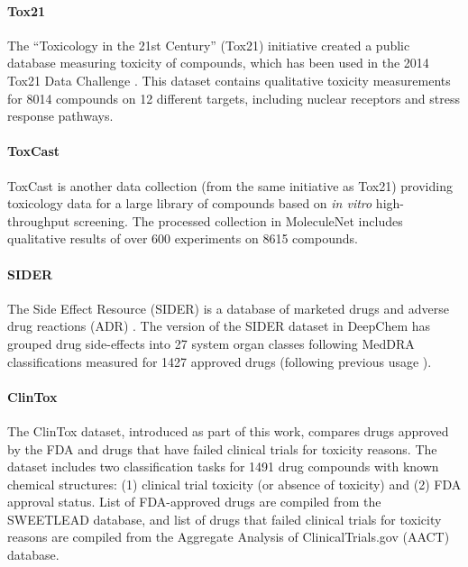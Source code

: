 \paragraph{Tox21}

The ``Toxicology in the 21st Century'' (Tox21) initiative created a public database measuring toxicity of compounds, which has been used in the 2014 Tox21 Data Challenge \cite{Tox21}. This dataset contains qualitative toxicity measurements for 8014 compounds on 12 different targets, including nuclear receptors and stress response pathways.


\paragraph{ToxCast}

ToxCast is another data collection (from the same initiative as Tox21) providing toxicology data for a large library of compounds based on \textit{in vitro} high-throughput screening.\cite{toxcast_dataset} The processed collection in MoleculeNet includes qualitative results of over 600 experiments on 8615 compounds.

\paragraph{SIDER}

The Side Effect Resource (SIDER) is a database of marketed drugs and adverse drug reactions (ADR) \cite{sider_dataset}. The version of the SIDER dataset in DeepChem \cite{altae2016low} has grouped drug side-effects into 27 system organ classes following MedDRA classifications \cite{meddra} measured for 1427 approved drugs (following previous usage \cite{altae2016low}).

\paragraph{ClinTox}

The ClinTox dataset, introduced as part of this work, compares drugs approved by the FDA and drugs that have failed clinical trials for toxicity reasons. \cite{PrOCTOR2016, InSilicoMed2016} The dataset includes two classification tasks for 1491 drug compounds with known chemical structures: (1) clinical trial toxicity (or absence of toxicity) and (2) FDA approval status. List of FDA-approved drugs are compiled from the SWEETLEAD database,\cite{SWEETLEAD_database} and list of drugs that failed clinical trials for toxicity reasons are compiled from the Aggregate Analysis of ClinicalTrials.gov (AACT) database.\cite{AACT}

